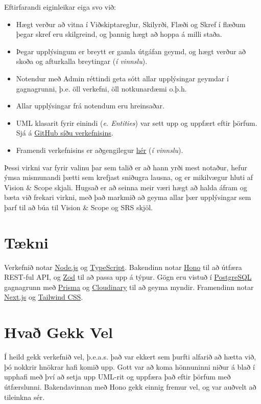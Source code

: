 \documentclass[a4paper,11pt]{article}\usepackage[pdftex]{graphicx}\usepackage[]{xcolor}
\begin{document}
Eftirfarandi eiginleikar eiga svo við:
\begin{itemize}
    \item Hægt verður að vitna í Viðskiptareglur, Skilyrði, Flæði og Skref í flæðum þegar skref eru skilgreind, og þannig hægt að hoppa á milli staða.
    \item Þegar upplýsingum er breytt er gamla útgáfan geymd, og hægt verður að skoða og afturkalla breytingar (\textit{í vinnslu}).
    \item Notendur með Admin réttindi geta sótt allar upplýsingar geymdar í gagnagrunni, þ.e. öll verkefni, öll notkunardæmi o.þ.h.
    \item Allar upplýsingar frá notendum eru hreinsaðar.
    \item UML klasarit fyrir einindi (\textit{e. Entities}) var sett upp og uppfært eftir þörfum. Sjá á \href{https://github.com/AndriFannar/HBV403G-Vef2-EV/tree/main/backend/designDocs/design.md}{GitHub síðu verkefnisins}.
    \item Framendi verkefnisins er aðgengilegur \href{https://hbv403g-vef2-ev-frontend.onrender.com}{hér} (\textit{í vinnslu}).
\end{itemize}

Þessi virkni var fyrir valinu þar sem talið er að hann yrði mest notaður, hefur ýmsa mismunandi þætti sem krefjast sniðugra lausna, og er mikilvægur hluti af Vision \& Scope skjali. Hugsað er að seinna meir væri hægt að halda áfram og bæta við frekari virkni, með það markmið að geyma allar þær upplýsingar sem þarf til að búa til Vision \& Scope og SRS skjöl. 

\section{Tækni}\label{taekni}
Verkefnið notar \href{https://nodejs.org/en}{Node.js} og \href{https://www.typescriptlang.org/}{TypeScript}. Bakendinn notar \href{https://hono.dev/}{Hono} til að útfæra REST-ful API, og \href{https://zod.dev/}{Zod} til að passa upp á týpur. Gögn eru vistuð í \href{https://www.postgresql.org/}{PostgreSQL} gagnagrunn með \href{https://www.prisma.io/}{Prisma} og \href{https://cloudinary.com/}{Cloudinary} til að geyma myndir. Framendinn notar \href{https://nextjs.org/}{Next.js} og \href{https://tailwindcss.com/}{Tailwind CSS}.

\section{Hvað Gekk Vel}
Í heild gekk verkefnið vel, þ.e.a.s. það var ekkert sem þurfti alfarið að hætta við, þó nokkrir hnökrar hafi komið upp. Gott var að koma hönnuninni niður á blað í upphafi með því að setja upp UML-rit og uppfæra það eftir þörfum með útfærslunni. Bakendavinnan með Hono gekk einnig fremur vel, og var auðvelt að tileinkna sér. 
\end{document}
